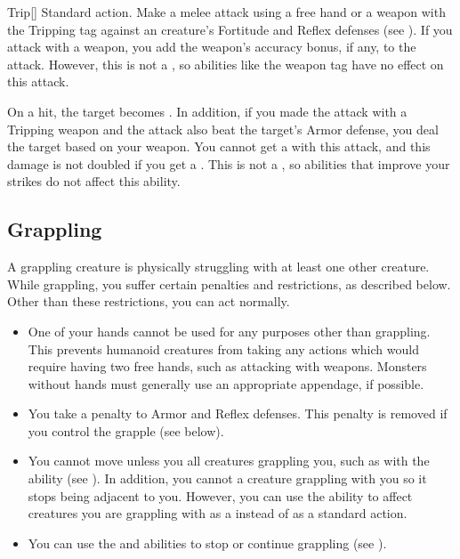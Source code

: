         \begin{activeability}{Trip}[]
            \label{Trip}
            \abilityusagetime Standard action.
            \rankline
            Make a melee attack using a free hand or a weapon with the Tripping tag against an creature's Fortitude and Reflex defenses (see ).
            If you attack with a weapon, you add the weapon's accuracy bonus, if any, to the attack.
            However, this is not a , so abilities like the  weapon tag have no effect on this attack.

            On a hit, the target becomes \prone.
            In addition, if you made the attack with a Tripping weapon and the attack also beat the target's Armor defense, you deal the target  based on your weapon.
            You cannot get a  with this attack, and this damage is not doubled if you get a .
            This is not a , so abilities that improve your strikes do not affect this ability.
        \end{activeability}

    \subsection{Grappling}\label{Grappling}
        A grappling creature is physically struggling with at least one other creature.
        While grappling, you suffer certain penalties and restrictions, as described below.
        Other than these restrictions, you can act normally.
        \begin{itemize}
            \item One of your hands cannot be used for any purposes other than grappling.
                This prevents humanoid creatures from taking any actions which would require having two free hands, such as attacking with  weapons.
                Monsters without hands must generally use an appropriate appendage, if possible.
            \item You take a  penalty to Armor and Reflex defenses.
                This penalty is removed if you control the grapple (see below).
            \item You cannot move unless you  all creatures grappling you, such as with the  ability (see ).
                In addition, you cannot  a creature grappling with you so it stops being adjacent to you.
                However, you can use the  ability to affect creatures you are grappling with as a  instead of as a standard action.
            \item You can use the  and  abilities to stop or continue grappling (see ).
        \end{itemize}

